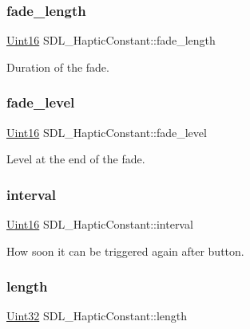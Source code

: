 \subsubsection{\texorpdfstring{fade\+\_\+length}{fade\_length}}
{\footnotesize\ttfamily \hyperlink{_s_d_l__stdinc_8h_a31fcc0a076c9068668173ee26d33e42b}{Uint16} S\+D\+L\+\_\+\+Haptic\+Constant\+::fade\+\_\+length}

Duration of the fade. \mbox{\label{struct_s_d_l___haptic_constant_a49f6499c89f3e494efbe92f12277c949}} 
\subsubsection{\texorpdfstring{fade\+\_\+level}{fade\_level}}
{\footnotesize\ttfamily \hyperlink{_s_d_l__stdinc_8h_a31fcc0a076c9068668173ee26d33e42b}{Uint16} S\+D\+L\+\_\+\+Haptic\+Constant\+::fade\+\_\+level}

Level at the end of the fade. \mbox{\label{struct_s_d_l___haptic_constant_ab1f7f0df856f4cf1fdf937cb886226b4}} 
\subsubsection{\texorpdfstring{interval}{interval}}
{\footnotesize\ttfamily \hyperlink{_s_d_l__stdinc_8h_a31fcc0a076c9068668173ee26d33e42b}{Uint16} S\+D\+L\+\_\+\+Haptic\+Constant\+::interval}

How soon it can be triggered again after button. \mbox{\label{struct_s_d_l___haptic_constant_aeb994c356b1d236b060f277d157e98ec}} 
\subsubsection{\texorpdfstring{length}{length}}
{\footnotesize\ttfamily \hyperlink{_s_d_l__stdinc_8h_add440eff171ea5f55cb00c4a9ab8672d}{Uint32} S\+D\+L\+\_\+\+Haptic\+Constant\+::length}

